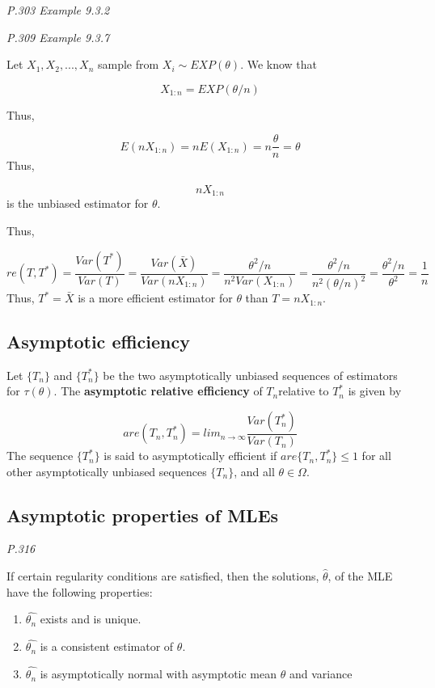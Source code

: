 \documentclass[]{book}
\begin{document}
\emph{P.303 Example 9.3.2}

\emph{P.309 Example 9.3.7}

Let \(X_1,X_2,...,X_n\) sample from \(X_i \sim EXP(\theta)\). We know that

\[X_{1:n}=EXP(\theta/n)\]

Thus,

\[E(nX_{1:n})=nE(X_{1:n})=n\frac{\theta}{n}=\theta\]
Thus,

\[nX_{1:n}\]
is the unbiased estimator for \(\theta\).

Thus,

\[re(T,T^*)=\frac{Var(T^*)}{Var(T)}=\frac{Var(\bar{X})}{Var(nX_{1:n})}=\frac{\theta^2/n}{n^2Var(X_{1:n})}=\frac{\theta^2/n}{n^2(\theta/n)^2}=\frac{\theta^2/n}{\theta^2}=\frac{1}{n}\]
Thus, \(T^*=\bar{X}\) is a more efficient estimator for \(\theta\) than \(T=nX_{1:n}\).

\hypertarget{asymptotic-efficiency}{%
\subsection{Asymptotic efficiency}\label{asymptotic-efficiency}}

Let \(\{T_n\}\) and \(\{T_n^*\}\) be the two asymptotically unbiased sequences of estimators for \(\tau(\theta)\). The \textbf{asymptotic relative efficiency} of \(T_n\)relative to \(T_n^*\) is given by

\[are(T_n,T_n^*)=lim_{n \rightarrow \infty} \frac{Var(T_n^*)}{Var(T_n)}\]
The sequence \(\{T_n^*\}\) is said to asymptotically efficient if \(are\{T_n, T_n^*\} \leq 1\) for all other asymptotically unbiased sequences \(\{T_n\}\), and all \(\theta \in \Omega\).

\hypertarget{asymptotic-properties-of-mles}{%
\subsection{Asymptotic properties of MLEs}\label{asymptotic-properties-of-mles}}

\emph{P.316}

If certain regularity conditions are satisfied, then the solutions, \(\hat{\theta}\), of the MLE have the following properties:

\begin{enumerate}
\def\labelenumi{(\arabic{enumi})}
\item
  \(\hat{\theta_n}\) exists and is unique.
\item
  \(\hat{\theta_n}\) is a consistent estimator of \(\theta\).
\item
  \(\hat{\theta_n}\) is asymptotically normal with asymptotic mean \(\theta\) and variance
\end{enumerate}
\end{document}
